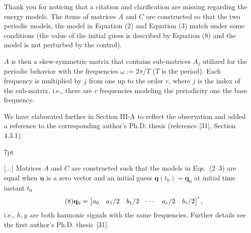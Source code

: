 \documentclass[10pt]{letter}
\newenvironment{formal}{%
  \def\FrameCommand{%
    \hspace{1pt}%
    {\color{red}\vrule width 2pt}%
    {\color{formalshade}\vrule width 4pt}%
    \colorbox{formalshade}%
  }%
  \MakeFramed{\advance\hsize-\width\FrameRestore}%
  \noindent\hspace{-4.55pt}%
  \begin{adjustwidth}{}{7pt}%
  \vspace{2pt}\vspace{2pt}%
}
{%
  \vspace{2pt}\end{adjustwidth}\endMakeFramed%
}
\begin{document}
{\color{blue} 

{\hspace*{-4.5em}{[R1:12]}\vspace*{-1.9em}}

Thank you for noticing that a citation and clarification are missing regarding the energy models. The items of matrices $A$ and $C$ are constructed so that the two periodic models, the model in Equation ({\color{red}2}) and Equation ({\color{red}3}) match under some conditions (the value of the initial guess is described by Equation ({\color{red}8}) and the model is not perturbed by the control).

$A$ is then a skew-symmetric matrix that contains sub-matrices $A_j$ utilized for the periodic behavior with the frequencies $\omega:=2\pi/T$ ($T$ is the period). Each frequency is multiplied by $j$ from one up to the order $r$, where $j$ is the index of the sub-matrix, i.e., there are $r$ frequencies modeling the periodicity one the base frequency.

We have elaborated further in Section III-A to reflect the observation and added a reference to the corresponding author's Ph.D. thesis (reference [{\color{green}31}], Section 4.3.1).

\begin{formal}
  {\color{black}
  [...] {\color{blue}Matrices $A$ and $C$ are constructed such that t}he %
  models in Eqs.~({\color{red}2}--{\color{red}3}) {\color{black}are equal when $\mathbf{u}$ is a {\color{black}zero vector %
  and an initial guess $\mathbf{q}(t_0)=\mathbf{q}_0$ at initial time instant $t_0$}}
    {\color{blue}\begin{equation}\tag{8}
    {\color{black}\mathbf{q}_0=\begin{bmatrix}a_0 & a_1/2 & b_1/2 & \cdots & a_r/2 & b_r/2\end{bmatrix}',}
    \end{equation}}
  \color{black}i.e., $h,y$ are both harmonic signals with the same frequencies. {\color{blue}Further details see the first author's Ph.D. thesis~[{\color{green}31}]}.
  }
  \vspace*{1ex}
\end{formal}
}
\end{document}
